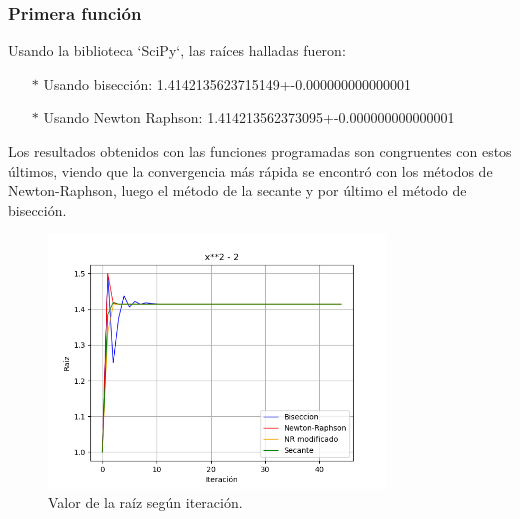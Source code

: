 \documentclass[titlepage,a4paper]{article}
\begin{document}
\subsubsection{Primera función}\label{sec:CR1}

Usando la biblioteca `SciPy`, las raíces halladas fueron:
\begin{itemize}
    \item[$*$]Usando bisección:  1.4142135623715149+-0.000000000000001
    \item[$*$]Usando Newton Raphson:  1.414213562373095+-0.000000000000001
\end{itemize}

Los resultados obtenidos con las funciones programadas son congruentes con estos últimos, viendo que la convergencia más rápida se encontró con los métodos de Newton-Raphson, luego el método de la secante y por último el método de bisección.

\begin{figure}[H]
\centering
\includegraphics[width=0.8\textwidth]{raiz f1.png}
\caption{\label{fig:class01}Valor de la raíz según iteración.}
\end{figure}
\end{document}

